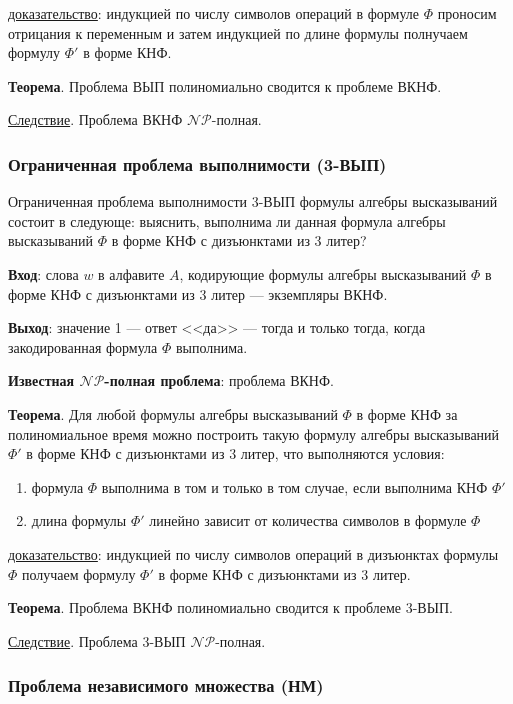 \underline{доказательство}: индукцией по числу символов операций в формуле $\Phi$ проносим отрицания к переменным и затем индукцией по длине формулы полнучаем формулу $\Phi'$ в форме КНФ.

\textbf{Теорема}. Проблема ВЫП полиномиально сводится к проблеме ВКНФ.

\underline{Следствие}. Проблема ВКНФ $\mathscr{NP}$-полная.

\subsubsection{Ограниченная проблема выполнимости (3-ВЫП)}
Ограниченная проблема выполнимости 3-ВЫП формулы алгебры высказываний состоит в следующе: выяснить, выполнима ли данная формула алгебры высказываний $\Phi$ в форме КНФ с дизъюнктами из 3 литер?

\textbf{Вход}: слова $w$ в алфавите $A$, кодирующие формулы алгебры высказываний $\Phi$ в форме КНФ с дизъюнктами из 3 литер --- экземпляры ВКНФ.

\textbf{Выход}: значение 1 --- ответ <<да>> --- тогда и только тогда, когда закодированная формула $\Phi$ выполнима.

\textbf{Известная $\mathscr{NP}$-полная проблема}: проблема ВКНФ.

\textbf{Теорема}. Для любой формулы алгебры высказываний $\Phi$ в форме КНФ за полиномиальное время можно построить такую формулу алгебры высказываний $\Phi'$ в форме КНФ с дизъюнктами из 3 литер, что выполняются условия:

\begin{enumerate}
    \item формула $\Phi$ выполнима в том и только в том случае, если выполнима КНФ $\Phi'$
    \item длина формулы $\Phi'$ линейно зависит от количества символов в формуле $\Phi$
\end{enumerate}

\underline{доказательство}: индукцией по числу символов операций в дизъюнктах формулы $\Phi$ получаем формулу $\Phi'$ в форме КНФ с дизъюнктами из 3 литер.

\textbf{Теорема}. Проблема ВКНФ полиномиально сводится к проблеме 3-ВЫП.

\underline{Следствие}. Проблема 3-ВЫП $\mathscr{NP}$-полная.

\subsubsection{Проблема независимого множества (НМ)}

